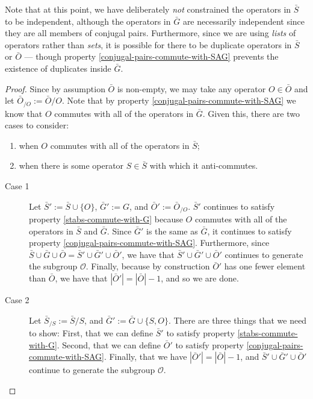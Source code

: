 \documentclass[twocolumn,showpacs,preprintnumbers,amsmath,amssymb,nofootinbib,pra,floatfix]{revtex4}
\newenvironment{remark}[1][Remark]{\begin{trivlist}
\item[\hskip \labelsep {\bfseries #1}]}{\end{trivlist}}
\begin{document}
\begin{remark}
Note that at this point, we have deliberately \emph{not} constrained the operators in $\bar S$ to be independent, although the operators in $\bar G$ are necessarily independent since they are all members of conjugal pairs.  Furthermore, since we are using \emph{lists} of operators rather than \emph{sets}, it is possible for there to be duplicate operators in $\bar S$ or $\bar O$ --- though property \ref{conjugal-pairs-commute-with-SAG} prevents the existence of duplicates inside $\bar G$.
\end{remark}

\begin{proof}
Since by assumption $\bar O$ is non-empty, we may take any operator $O\in \bar O$ and let $\bar O_{\slash O}:=\bar O\slash O$.  Note that by property \ref{conjugal-pairs-commute-with-SAG} we know that $O$ commutes with all of the operators in $\bar G$.  Given this, there are two cases to consider:
\begin{enumerate}
\item when $O$ commutes with all of the operators in $\bar S$;
\item when there is some operator $S\in\bar S$ with which it anti-commutes.
\end{enumerate}

\begin{description}
\item[Case 1]
Let $\bar S':= \bar S \cup \{O\}$, $\bar G' := G$, and $\bar O' := \bar O_{\slash O}$.  $\bar S'$ continues to satisfy property \ref{stabs-commute-with-G} because $O$ commutes with all of the operators in $\bar S$ and $\bar G$.  Since $\bar G'$ is the same as $\bar G$, it continues to satisfy property \ref{conjugal-pairs-commute-with-SAG}.  Furthermore, since $\bar S\cup \bar G \cup \bar O=\bar S' \cup \bar G' \cup \bar O'$, we have that $\bar S' \cup \bar G' \cup \bar O'$ continues to generate the subgroup $\mathcal{O}$.  Finally, because by construction $\bar O'$ has one fewer element than $\bar O$, we have that $|\bar O'|=|\bar O|-1$, and so we are done.
\item[Case 2]
Let $\bar S_{\slash S}:=\bar S\slash S$, and $\bar G' := \bar G \cup \{S,O\}$.  There are three things that we need to show:  First, that we can define $\bar S'$ to satisfy property \ref{stabs-commute-with-G}.  Second, that we can define $\bar O'$ to satisfy property \ref{conjugal-pairs-commute-with-SAG}.  Finally, that we have $|\bar O'|=|\bar O|-1$, and  $\bar S' \cup \bar G' \cup \bar O'$ continue to generate the subgroup $\mathcal{O}$.


\end{description}
\end{proof}
\end{document}
